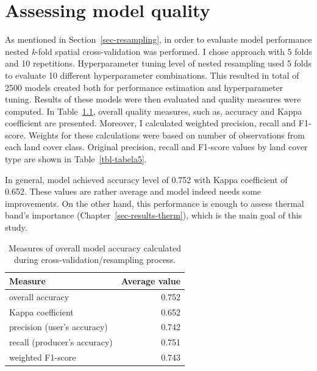 \documentclass{amuthesis}
\begin{document}

\hypertarget{sec-results-eval}{%
\chapter{Assessing model quality}\label{sec-results-eval}}

As mentioned in Section~\ref{sec-resampling}, in order to evaluate model
performance nested \emph{k}-fold spatial cross-validation was performed.
I chose approach with 5 folds and 10 repetitions. Hyperparameter tuning
level of nested resampling used 5 folds to evaluate 10 different
hyperparameter combinations. This resulted in total of 2500 models
created both for performance estimation and hyperparameter tuning.
Results of these models were then evaluated and quality measures were
computed. In Table~\ref{tbl-tabela4}, overall quality measures, such as,
accuracy and Kappa coefficient are presented. Moreover, I calculated
weighted precision, recall and F1-score. Weights for these calculations
were based on number of observations from each land cover class.
Original precision, recall and F1-score values by land cover type are
shown in Table~\ref{tbl-tabela5}.

In general, model achieved accuracy level of 0.752 with Kappa
coefficient of 0.652. These values are rather average and model indeed
needs some improvements. On the other hand, this performance is enough
to assess thermal band's importance (Chapter~\ref{sec-results-therm}),
which is the main goal of this study.

\hypertarget{tbl-tabela4}{}
\begin{table}
\caption{\label{tbl-tabela4}Measures of overall model accuracy calculated during
cross-validation/resampling process. }\tabularnewline

\centering
\begin{tabular}{|>{}l|>{}r|}
\toprule
\textbf{Measure} & \textbf{Average value}\\
\midrule
overall accuracy & 0.752\\
\hline
Kappa coefficient & 0.652\\
\hline
precision (user's accuracy) & 0.742\\
\hline
recall (producer's accuracy) & 0.751\\
\hline
weighted F1-score & 0.743\\
\bottomrule
\end{tabular}
\end{table}
\end{document}
